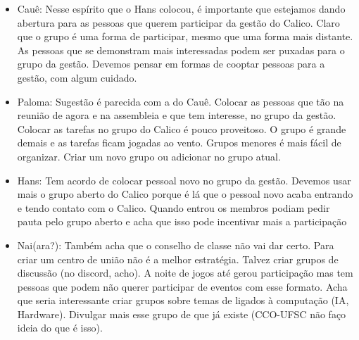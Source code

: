 \documentclass{ata-calico}
\begin{document}
\begin{itemize}
\item Cauê: Nesse espírito que o Hans colocou, é importante que estejamos dando abertura para as pessoas que querem participar da gestão do Calico. Claro que o grupo é uma forma de participar, mesmo que uma forma mais distante. As pessoas que se demonstram mais interessadas podem ser puxadas para o grupo da gestão. Devemos pensar em formas de cooptar pessoas para a gestão, com algum cuidado.

\item Paloma: Sugestão é parecida com a do Cauê. Colocar as pessoas que tão na reunião de agora e na assembleia e que tem interesse, no grupo da gestão. Colocar as tarefas no grupo do Calico é pouco proveitoso. O grupo é grande demais e as tarefas ficam jogadas ao vento. Grupos menores é mais fácil de organizar. Criar um novo grupo ou adicionar no grupo atual.

\item Hans: Tem acordo de colocar pessoal novo no grupo da gestão. Devemos usar mais o grupo aberto do Calico porque é lá que o pessoal novo acaba entrando e tendo contato com o Calico. Quando entrou os membros podiam pedir pauta pelo grupo aberto e acha que isso pode incentivar mais a participação

\item Nai(ara?): Também acha que o conselho de classe não vai dar certo. Para criar um centro de união não é a melhor estratégia. Talvez criar grupos de discussão (no discord, acho). A noite de jogos até gerou participação mas tem pessoas que podem não querer participar de eventos com esse formato. Acha que seria interessante criar grupos sobre temas de ligados à computação (IA, Hardware). Divulgar mais esse grupo de que já existe (CCO-UFSC não faço ideia do que é isso).
\end{itemize}
\end{document}
